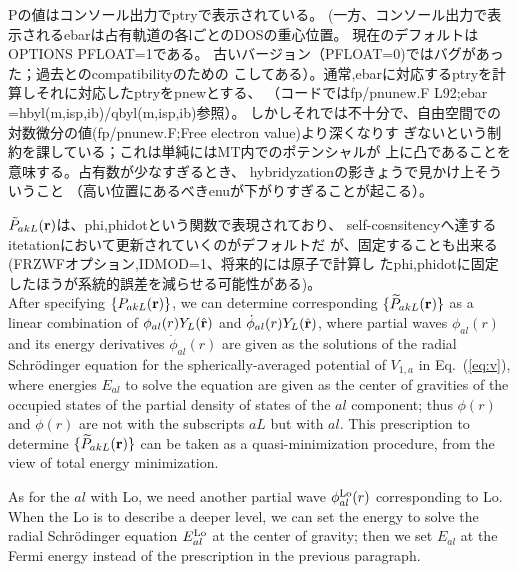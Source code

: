 \documentclass[twocolumn,showpacs,preprintnumbers,amsmath,amssymb,floatfix]{revtex4-1}
\newcommand{\bfr}{{\bf r}}
\def\phidot{\dot{\phi}}
\newcommand{\req}[1]{\mbox{Eq.~\!(\ref{#1})}}
\def\PakL{P_{akL}}
\def\wPakL{\widetilde{P}_{akL}}
\def\PakL{P_{akL}}
\def\wPakL{\widetilde{P}_{akL}}
\begin{document}
Pの値はコンソール出力でptryで表示されている。
(一方、コンソール出力で表示されるebarは占有軌道の各lごとのDOSの重心位置。
現在のデフォルトはOPTIONS PFLOAT=1である。
古いバージョン（PFLOAT=0)ではバグがあった；過去とのcompatibilityのための
こしてある）。通常,ebarに対応するptryを計算しそれに対応したptryをpnewとする、
（コードではfp/pnunew.F L92;ebar =hbyl(m,isp,ib)/qbyl(m,isp,ib)参照）。
しかしそれでは不十分で、自由空間での対数微分の値(fp/pnunew.F;Free electron value)より深くなりす
ぎないという制約を課している；これは単純にはMT内でのポテンシャルが
上に凸であることを意味する。占有数が少なすぎるとき、
hybridyzationの影きょうで見かけ上そういうこと
（高い位置にあるべきenuが下がりすぎることが起こる）。


$\tilde{P}_{akL}(\bfr)$は、phi,phidotという関数で表現されており、
self-cosnsitencyへ達するitetationにおいて更新されていくのがデフォルトだ
が、固定することも出来る(FRZWFオプション,IDMOD=1、将来的には原子で計算し
たphi,phidotに固定したほうが系統的誤差を減らせる可能性がある)。\\

After specifying $\{\PakL(\bfr) \}$, we can determine corresponding
$\{\wPakL(\bfr) \}$ as a linear combination of
$\phi_{al}(r)Y_L(\hat{\bfr})$ and $\phidot_{al}(r)Y_L(\hat{\bfr})$,
where partial waves $\phi_{al}(r)$ and its energy derivatives
$\phidot_{al}(r)$ are given as the solutions of the radial Schr\"odinger
equation for the spherically-averaged potential of $V_{1,a}$ in
\req{eq:v}, where energies $E_{al}$ to solve the equation are given as
the center of gravities of the occupied states of the partial density of
states of the $al$ component; thus 
$\phi(r)$ and $\phidot(r)$ are not with the subscripts $aL$ but with $al$.
This prescription to determine $\{\wPakL(\bfr) \}$ can be taken as a
quasi-minimization procedure, from the view of total energy
minimization.

As for the $al$ with Lo, we need another partial wave $\phi^{\rm
Lo}_{al}(r)$ corresponding to Lo.  When the Lo is to describe a deeper
level, we can set the energy to solve the radial Schr\"odinger equation
$E^{\rm Lo}_{al}$ at the center of gravity; then we set $E_{al}$ at the
Fermi energy instead of the prescription in the previous paragraph.
\end{document}
